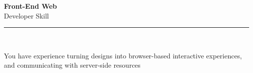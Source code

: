 \documentclass[11pt,a4paper]{memoir}
\begin{document}
    \begin{Spacing}{0.75}%
        \noindent
        \Large
        \textbf{Front-End Web}\\[3pt]
        \scriptsize\color{gray}Developer Skill\\ 
        \rule{\textwidth}{.3mm}\\
        
        \vspace{3mm}
        \noindent
        \begin{minipage}[t]{53mm}
            \begin{flushleft}
            {
                \normalsize
                \begin{Spacing}{1}%
                \color{black}\textrm{You have experience turning designs into browser-based interactive experiences, and communicating with server-side resources}\\
                \end{Spacing}
            }
            \end{flushleft}
        \end{minipage}

        \vspace{5mm}
        \noindent
        \begin{minipage}[t]{53mm}
            \begin{flushleft}
            {
                \normalsize
                \begin{Spacing}{1}%
                \color{gray}\textit{}\\
                \end{Spacing}
            }
            \end{flushleft}
        \end{minipage}
    \end{Spacing}
    \clearpage
\end{document}
